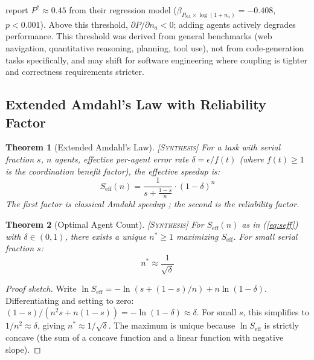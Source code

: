 \documentclass[11pt, a4paper, logo, copyright]{googledeepmind}
\newtheorem{theorem}{Theorem}[section]
\newcommand{\synthesis}{\textsc{[Synthesis]}}
\begin{document}
\citet{Kim2025} report $P^* \approx 0.45$ from their regression model ($\beta_{P_{\mathrm{SA}} \times \log(1+n_a)} = -0.408$, $p < 0.001$).
Above this threshold, $\partial P / \partial n_a < 0$; adding agents actively degrades performance.
This threshold was derived from general benchmarks (web navigation, quantitative reasoning, planning, tool use), not from code-generation tasks specifically, and may shift for software engineering where coupling is tighter and correctness requirements stricter.

\subsection{Extended Amdahl's Law with Reliability Factor}

\begin{theorem}[Extended Amdahl's Law] \synthesis{}
\label{thm:amdahl}
For a task with serial fraction $s$, $n$ agents, effective per-agent error rate $\delta = \epsilon / f(t)$ (where $f(t) \geq 1$ is the coordination benefit factor), the effective speedup is:
\begin{equation}
\label{eq:seff}
  S_{\mathrm{eff}}(n) = \frac{1}{s + \frac{1-s}{n}} \cdot (1 - \delta)^n
\end{equation}
The first factor is classical Amdahl speedup \citep{Amdahl1967}; the second is the reliability factor.
\end{theorem}

\begin{theorem}[Optimal Agent Count] \synthesis{}
\label{thm:nstar}
For $S_{\mathrm{eff}}(n)$ as in (\ref{eq:seff}) with $\delta \in (0,1)$, there exists a unique $n^* \geq 1$ maximizing $S_{\mathrm{eff}}$.
For small serial fraction $s$:
\begin{equation}
\label{eq:nstar}
  n^* \approx \frac{1}{\sqrt{\delta}}
\end{equation}
\end{theorem}

\begin{proof}[Proof sketch]
Write $\ln S_{\mathrm{eff}} = -\ln(s + (1-s)/n) + n \ln(1-\delta)$.
Differentiating and setting to zero: $(1-s)/(n^2 s + n(1-s)) = -\ln(1-\delta) \approx \delta$.
For small $s$, this simplifies to $1/n^2 \approx \delta$, giving $n^* \approx 1/\sqrt{\delta}$.
The maximum is unique because $\ln S_{\mathrm{eff}}$ is strictly concave (the sum of a concave function and a linear function with negative slope).
\end{proof}
\end{document}

